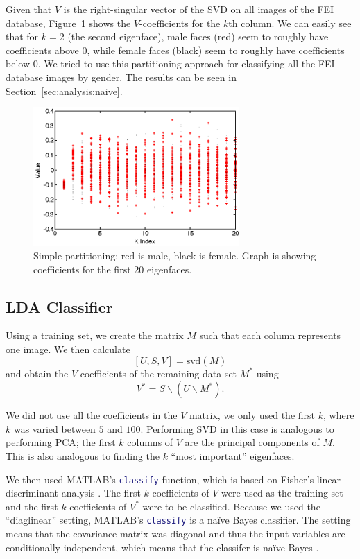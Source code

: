 \documentclass[hidelinks,11pt]{article}
\begin{document}
Given that $V$ is the right-singular vector of the SVD on all images of the FEI
database, Figure~\ref{fig:model:naive:part} shows the $V$-coefficients for the
$k$th column. We can easily see that for $k = 2$ (the second eigenface), male
faces (red) seem to roughly have coefficients above 0, while female faces
(black) seem to roughly have coefficients below 0. We tried to use this
partitioning approach for classifying all the FEI database images by gender. The
results can be seen in Section~\ref{sec:analysis:naive}.

\begin{figure}[!ht]
  \centering
  \includegraphics[width=0.7\textwidth]{naive_classifier_k_partition.png}
  \caption{Simple partitioning: red is male, black is female. Graph is showing
  coefficients for the first 20 eigenfaces.}
  \label{fig:model:naive:part}
\end{figure}

\pagebreak
\subsection{LDA Classifier} 
\label{sec:model:lda}

Using a training set, we create the matrix $M$ such that each column represents
one image. We then calculate
\[ \left[ U, S, V \right] = \mathrm{svd}(M) \]
and obtain the $V$ coefficients of the remaining data set $M^*$ using
\[ V^* = S \backslash (U \backslash M^*). \]

We did not use all the coefficients in the $V$ matrix, we only used the first
$k$, where $k$ was varied between $5$ and $100$. Performing SVD in this case is
analogous to performing PCA; the first $k$ columns of $V$ are the principal
components of $M$. This is also analogous to finding the $k$ ``most important''
eigenfaces.

We then used MATLAB's \lstinline[language=Matlab]!classify! function, which is
based on Fisher's linear discriminant analysis \cite{classify}. The first $k$
coefficients of $V$ were used as the training set and the first $k$ coefficients
of $V^*$ were to be classified. Because we used the ``diaglinear'' setting,
MATLAB's \lstinline[language=Matlab]!classify! is a na\"ive Bayes classifier.
The setting means that the covariance matrix was diagonal and thus the input
variables are conditionally independent, which means that the classifer is
na\"ive Bayes \cite{nbayes}.
\end{document}
